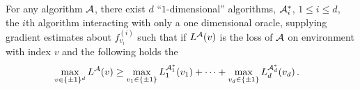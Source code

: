 
\begin{lemma}
For any algorithm $\mathcal{A}$, there exist  $d$ ``$1$-dimensional'' algorithms, $\mathcal{A}_i^*$, $1\le i \le d$,
the $i$th algorithm interacting with only a one dimensional oracle, supplying gradient estimates about $f_{v_i}^{(i)}$ 
such that if $L^{\mathcal{A}}(v)$ is the loss of $\mathcal{A}$ on environment with index $v$ and the following holds
the 
\begin{align}
\label{eq:onedimlb}
&\max_{v\in \{\pm 1\}^d} L^{\mathcal{A}}(v) 
\ge   \max_{v_1\in \{\pm 1\}} L_1^{\mathcal{A}_1^*}(v_1) + \dots + \max_{v_d\in \{\pm 1 \}} L_d^{\mathcal{A}^*_d}(v_d)\,.
\end{align}
\end{lemma}
